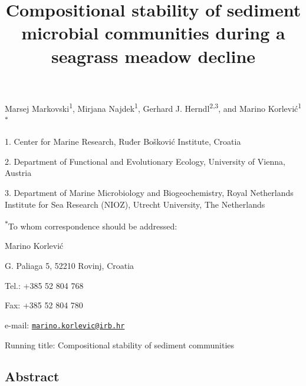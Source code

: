 \documentclass[12pt,]{article}
\title{\textbf{Compositional stability of sediment microbial communities during
a seagrass meadow decline}}
\author{}
\date{\vspace{-2.5em}}
\begin{document}
\maketitle

\vspace{20mm}

Marsej Markovski\textsuperscript{1}, Mirjana Najdek\textsuperscript{1},
Gerhard J. Herndl\textsuperscript{2,3}, and Marino
Korlević\textsuperscript{1\(*\)}

1. Center for Marine Research, Ruđer Bošković Institute, Croatia

2. Department of Functional and Evolutionary Ecology, University of
Vienna, Austria

3. Department of Marine Microbiology and Biogeochemistry, Royal
Netherlands Institute for Sea Research (NIOZ), Utrecht University, The
Netherlands

\textsuperscript{\(*\)}To whom correspondence should be addressed:

Marino Korlević

G. Paliaga 5, 52210 Rovinj, Croatia

Tel.: +385 52 804 768

Fax: +385 52 804 780

e-mail:
\href{mailto:marino.korlevic@irb.hr}{\nolinkurl{marino.korlevic@irb.hr}}

Running title: Compositional stability of sediment communities

\newpage
\linenumbers
{}
\setlength\parindent{24pt}

\hypertarget{abstract}{%
\subsection{Abstract}\label{abstract}}
\end{document}
